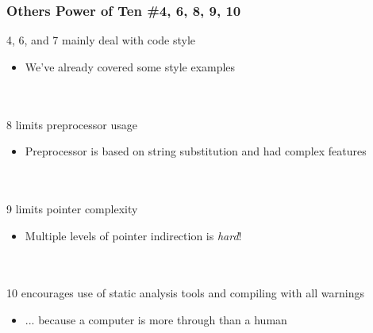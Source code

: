 \documentclass{beamer}
\begin{document}
\begin{frame} [fragile]
\frametitle{Others \small{Power of Ten \#4, 6, 8, 9, 10}}
4, 6, and 7 mainly deal with code style \\
\begin{itemize}
  \item We've already covered some style examples
\end{itemize}
\hfill \\
\hfill \\
8 limits preprocessor usage \\
\begin{itemize}
  \item Preprocessor is based on string substitution and had complex features
\end{itemize}
\hfill \\
\hfill \\
9 limits pointer complexity \\
\begin{itemize}
  \item Multiple levels of pointer indirection is \textit{hard}!
\end{itemize}
\hfill \\
\hfill \\
10 encourages use of static analysis tools and compiling with all warnings \\
\begin{itemize}
  \item ... because a computer is more through than a human
\end{itemize}
\end{frame}
\end{document}

